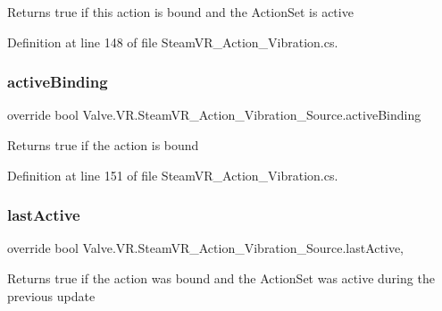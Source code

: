 Returns true if this action is bound and the Action\+Set is active 



Definition at line 148 of file Steam\+V\+R\+\_\+\+Action\+\_\+\+Vibration.\+cs.

\mbox{\label{class_valve_1_1_v_r_1_1_steam_v_r___action___vibration___source_a70fcfe02e0523d10e61c7008787c8121}} 
\subsubsection{\texorpdfstring{activeBinding}{activeBinding}}
{\footnotesize\ttfamily override bool Valve.\+V\+R.\+Steam\+V\+R\+\_\+\+Action\+\_\+\+Vibration\+\_\+\+Source.\+active\+Binding\hspace{0.3cm}{\ttfamily [get]}}



Returns true if the action is bound 



Definition at line 151 of file Steam\+V\+R\+\_\+\+Action\+\_\+\+Vibration.\+cs.

\mbox{\label{class_valve_1_1_v_r_1_1_steam_v_r___action___vibration___source_a6e6f97ddcab58758406ca07a89229cc6}} 
\subsubsection{\texorpdfstring{lastActive}{lastActive}}
{\footnotesize\ttfamily override bool Valve.\+V\+R.\+Steam\+V\+R\+\_\+\+Action\+\_\+\+Vibration\+\_\+\+Source.\+last\+Active\hspace{0.3cm}{\ttfamily [get]}, {}}



Returns true if the action was bound and the Action\+Set was active during the previous update 



